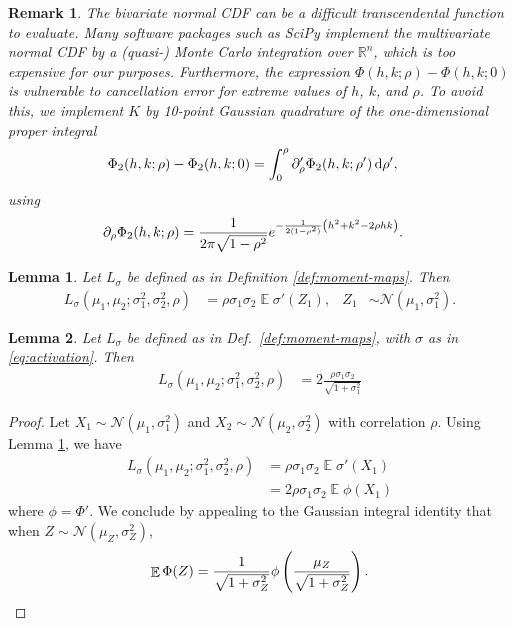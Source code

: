 \documentclass[oneside, article]{memoir}
\newtheorem{remark}{Remark}
\newtheorem{lemma}{Lemma}
\DeclareMathOperator{\expect}{\mathbb{E}}
\begin{document}
\begin{remark}
  The bivariate normal CDF can be a difficult transcendental function
  to evaluate.
  Many software packages such as SciPy \cite{wagner_kalman_2022}
  implement the multivariate normal CDF by a (quasi-) Monte Carlo
  integration over \(\mathbb{R}^n\), which is too expensive for our purposes.
  Furthermore, the expression \(\Phi(h, k; \rho) - \Phi(h, k; 0)\) is
  vulnerable to cancellation error for extreme values of \(h\),
  \(k\), and \(\rho\).
  To avoid this, we implement \(K\) by 10-point Gaussian quadrature
  of the one-dimensional proper integral \cite{drezner_computation_1990}
  \begin{align*}
    \Phi_2(h, k; \rho) -
    \Phi_2(h, k; 0)
    &= \int_0^\rho \partial_\rho' \Phi_2(h, k; \rho') \dif\rho',
  \end{align*}
  using
  \begin{align*}
    \partial_\rho \Phi_2(h, k; \rho)
    &= \frac{1}{2\pi \sqrt{1 - \rho^2}} e^{-\frac{1}{2(1 - \rho^2)}
    \del{h^2 + k^2 - 2 \rho h k}}.
  \end{align*}
\end{remark}

\begin{lemma}
  \label{lem:stein}
  Let \(L_\sigma\) be defined as in Definition \ref{def:moment-maps}.
  Then
  \begin{align*}
    L_\sigma(\mu_1, \mu_2; \sigma_1^2, \sigma_2^2, \rho) &= \rho
    \sigma_1 \sigma_2 \expect \sigma'(Z_1),
    & Z_1 &\sim \mathcal N(\mu_1, \sigma^2_1).
  \end{align*}
\end{lemma}

\begin{lemma}
  Let \(L_\sigma\) be defined as in Def.~\ref{def:moment-maps}, with
  \(\sigma\) as in \eqref{eq:activation}.
  Then
  \begin{align*}
    L_\sigma(\mu_1, \mu_2; \sigma_1^2, \sigma_2^2, \rho) &= 2
    \frac{\rho \sigma_1 \sigma_2}{\sqrt{1 + \sigma_1^2}}
  \end{align*}
\end{lemma}
\begin{proof}
  Let \(X_1 \sim \mathcal N(\mu_1, \sigma_1^2)\) and \(X_2 \sim
  \mathcal N(\mu_2, \sigma_2^2)\) with correlation \(\rho\).
  Using Lemma \ref{lem:stein}, we have
  \begin{align}
    L_\sigma(\mu_1, \mu_2; \sigma_1^2, \sigma_2^2, \rho)
    &= \rho \sigma_1 \sigma_2 \expect \sigma'(X_1)
    \\
    &= 2\rho \sigma_1 \sigma_2 \expect \phi(X_1)
  \end{align}
  where \(\phi = \Phi'\).
  We conclude by appealing to the Gaussian integral identity that
  when \(Z \sim \mathcal N(\mu_Z, \sigma_Z^2)\),
  \begin{align}
    \expect \Phi(Z) = \frac{1}{\sqrt{1 + \sigma^2_Z}}
    \phi\del{\frac{\mu_Z}{\sqrt{1 + \sigma^2_Z}}}.
  \end{align}
\end{proof}
\end{document}
